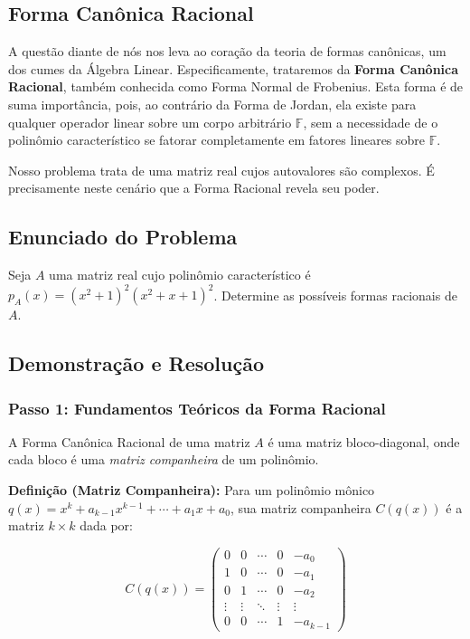 \subsection*{Forma Canônica Racional}

A questão diante de nós nos leva ao coração da teoria de formas canônicas, um dos cumes da Álgebra Linear. Especificamente, trataremos da \textbf{Forma Canônica Racional}, também conhecida como Forma Normal de Frobenius. Esta forma é de suma importância, pois, ao contrário da Forma de Jordan, ela existe para qualquer operador linear sobre um corpo arbitrário $\mathbb{F}$, sem a necessidade de o polinômio característico se fatorar completamente em fatores lineares sobre $\mathbb{F}$.

Nosso problema trata de uma matriz real cujos autovalores são complexos. É precisamente neste cenário que a Forma Racional revela seu poder.

\subsection*{Enunciado do Problema}

Seja $A$ uma matriz real cujo polinômio característico é $p_A(x) = (x^2+1)^2(x^2+x+1)^2$.  
Determine as possíveis formas racionais de $A$.

\subsection*{Demonstração e Resolução}

\subsubsection*{Passo 1: Fundamentos Teóricos da Forma Racional}

A Forma Canônica Racional de uma matriz $A$ é uma matriz bloco-diagonal, onde cada bloco é uma \textit{matriz companheira} de um polinômio.

\textbf{Definição (Matriz Companheira):} Para um polinômio mônico $q(x)=x^k+a_{k-1}x^{k-1}+\cdots+a_1x+a_0$, sua matriz companheira $C(q(x))$ é a matriz $k\times k$ dada por:

\[
C(q(x)) =
\begin{pmatrix}
0 & 0 & \cdots & 0 & -a_0 \\
1 & 0 & \cdots & 0 & -a_1 \\
0 & 1 & \cdots & 0 & -a_2 \\
\vdots & \vdots & \ddots & \vdots & \vdots \\
0 & 0 & \cdots & 1 & -a_{k-1}
\end{pmatrix}
\]

